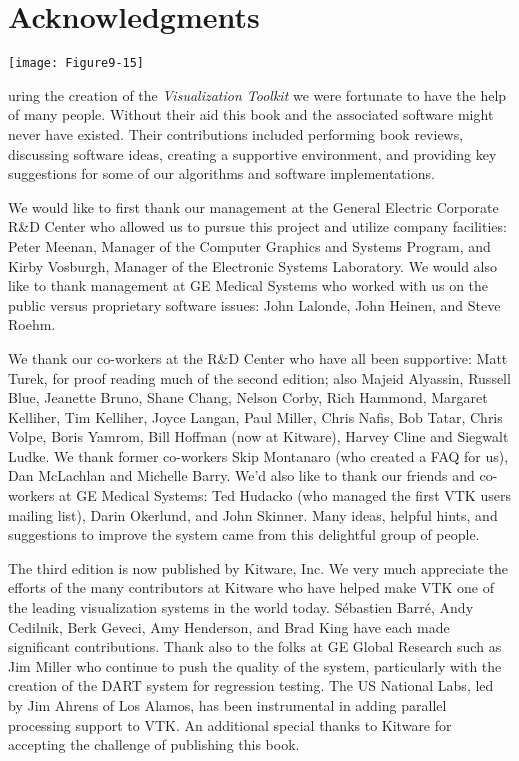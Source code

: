 \chapter*{Acknowledgments}
\markright{}

\vspace{-7\baselineskip} %
\hfill
 \begin{minipage}{0.5\textwidth}
 \centering
 \texttt{[image: Figure9-15]}
 \end{minipage}
\vspace{2\baselineskip}



uring the creation of the \textit{Visualization Toolkit} we were fortunate to have the help of many people. Without their aid this book and the associated software might never have existed. Their contributions included performing book reviews, discussing software ideas, creating a supportive environment, and providing key suggestions for some of our algorithms and software implementations.

We would like to first thank our management at the General Electric Corporate R\&D Center who allowed us to pursue this project and utilize company facilities: Peter Meenan, Manager of the Computer Graphics and Systems Program, and Kirby Vosburgh, Manager of the Electronic Systems Laboratory. We would also like to thank management at GE Medical Systems who worked with us on the public versus proprietary software issues: John Lalonde, John Heinen, and Steve Roehm.

We thank our co-workers at the R\&D Center who have all been supportive: Matt Turek, for proof reading much of the second edition; also Majeid Alyassin, Russell Blue, Jeanette Bruno, Shane Chang, Nelson Corby, Rich Hammond, Margaret Kelliher, Tim Kelliher, Joyce Langan, Paul Miller, Chris Nafis, Bob Tatar, Chris Volpe, Boris Yamrom, Bill Hoffman (now at Kitware), Harvey Cline and Siegwalt Ludke. We thank former co-workers Skip Montanaro (who created a FAQ for us), Dan McLachlan and Michelle Barry. We'd also like to thank our friends and co-workers at GE Medical Systems: Ted Hudacko (who managed the first VTK users mailing list), Darin Okerlund, and John Skinner. Many ideas, helpful hints, and suggestions to improve the system came from this delightful group of people.

The third edition is now published by Kitware, Inc. We very much appreciate the efforts of the many contributors at Kitware who have helped make VTK one of the leading visualization systems in the world today. Sébastien Barré, Andy Cedilnik, Berk Geveci, Amy Henderson, and Brad King have each made significant contributions. Thank also to the folks at GE Global Research such as Jim Miller who continue to push the quality of the system, particularly with the creation of the DART system for regression testing. The US National Labs, led by Jim Ahrens of Los Alamos, has been instrumental in adding parallel processing support to VTK. An additional special thanks to Kitware for accepting the challenge of publishing this book.

